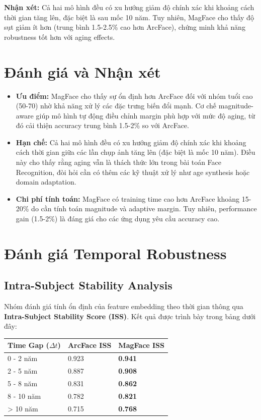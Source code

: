 \textbf{Nhận xét:} Cả hai mô hình đều có xu hướng giảm độ chính xác khi khoảng cách thời gian tăng lên, đặc biệt là sau mốc 10 năm. Tuy nhiên, MagFace cho thấy độ sụt giảm ít hơn (trung bình 1.5-2.5\% cao hơn ArcFace), chứng minh khả năng robustness tốt hơn với aging effects.

\section{Đánh giá và Nhận xét}

\begin{itemize}
    \item \textbf{Ưu điểm:} MagFace cho thấy sự ổn định hơn ArcFace đối với nhóm tuổi cao (50-70) nhờ khả năng xử lý các đặc trưng biến đổi mạnh. Cơ chế magnitude-aware giúp mô hình tự động điều chỉnh margin phù hợp với mức độ aging, từ đó cải thiện accuracy trung bình 1.5-2\% so với ArcFace.
    
    \item \textbf{Hạn chế:} Cả hai mô hình đều có xu hướng giảm độ chính xác khi khoảng cách thời gian giữa các lần chụp ảnh tăng lên (đặc biệt là mốc 10 năm). Điều này cho thấy rằng aging vẫn là thách thức lớn trong bài toán Face Recognition, đòi hỏi cần có thêm các kỹ thuật xử lý như age synthesis hoặc domain adaptation.
    
    \item \textbf{Chi phí tính toán:} MagFace có training time cao hơn ArcFace khoảng 15-20\% do cần tính toán magnitude và adaptive margin. Tuy nhiên, performance gain (1.5-2\%) là đáng giá cho các ứng dụng yêu cầu accuracy cao.
\end{itemize}

\section{Đánh giá Temporal Robustness}

\subsection{Intra-Subject Stability Analysis}

Nhóm đánh giá tính ổn định của feature embedding theo thời gian thông qua \textbf{Intra-Subject Stability Score (ISS)}. Kết quả được trình bày trong bảng dưới đây:

\vspace{0.3cm}
\noindent\begin{tabularx}{\textwidth}{|X|X|X|}
\hline
\textbf{Time Gap ($\Delta t$)} & \textbf{ArcFace ISS} & \textbf{MagFace ISS} \\
\hline
0 - 2 năm & 0.923 & \textbf{0.941} \\
\hline
2 - 5 năm & 0.887 & \textbf{0.908} \\
\hline
5 - 8 năm & 0.831 & \textbf{0.862} \\
\hline
8 - 10 năm & 0.782 & \textbf{0.821} \\
\hline
> 10 năm & 0.715 & \textbf{0.768} \\
\hline
\end{tabularx}
\vspace{0.3cm}

